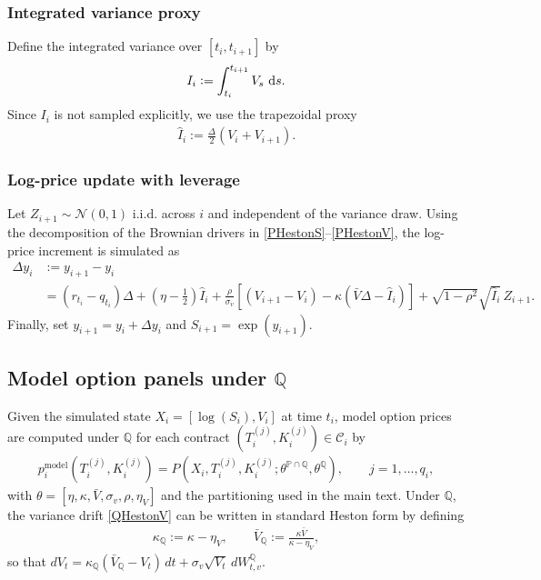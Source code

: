 \documentclass[11pt,a4paper,notitlepage]{article}
\numberwithin{equation}{section}
\begin{document}
\subsubsection{Integrated variance proxy}
Define the integrated variance over $[t_i,t_{i+1}]$ by
\begin{align}
I_i := \int_{t_i}^{t_{i+1}} V_s\,\dif s.
\end{align}
Since $I_i$ is not sampled explicitly, we use the trapezoidal proxy
\begin{align}
\widehat{I}_i := \frac{\Delta}{2}\left(V_i+V_{i+1}\right).
\label{eq:I_trap}
\end{align}

\subsubsection{Log-price update with leverage}
Let $Z_{i+1}\sim\mathcal{N}(0,1)$ i.i.d. across $i$ and independent of the variance draw.
Using the decomposition of the Brownian drivers in \eqref{PHestonS}--\eqref{PHestonV},
the log-price increment is simulated as
\begin{align}
\Delta y_i
&:= y_{i+1}-y_i \nonumber\\
&= (r_{t_i}-q_{t_i})\Delta
+ \left(\eta-\frac{1}{2}\right)\widehat{I}_i
+ \frac{\rho}{\sigma_v}\left[\left(V_{i+1}-V_i\right)-\kappa\left(\bar{V}\Delta-\widehat{I}_i\right)\right]
+ \sqrt{1-\rho^2}\sqrt{\widehat{I}_i}\,Z_{i+1}.
\label{eq:logS_update}
\end{align}
Finally, set $y_{i+1}=y_i+\Delta y_i$ and $S_{i+1}=\exp(y_{i+1})$.

\subsection{Model option panels under $\mathbb{Q}$}
Given the simulated state $X_i=[\log(S_i),V_i]$ at time $t_i$, model option prices are computed under
$\mathbb{Q}$ for each contract $(T_i^{(j)},K_i^{(j)})\in\mathcal{C}_i$ by
\begin{align}
p_{i}^{\mathrm{model}}(T_i^{(j)},K_i^{(j)})
= P\!\left(X_i,T_i^{(j)},K_i^{(j)};\theta^{\mathbb{P}\cap\mathbb{Q}},\theta^{\mathbb{Q}}\right),
\qquad j=1,\dots,q_i,
\label{eq:panel_model_prices}
\end{align}
with $\theta=[\eta,\kappa,\bar V,\sigma_v,\rho,\eta_V]$ and the partitioning used in the main text.
Under $\mathbb{Q}$, the variance drift \eqref{QHestonV} can be written in standard Heston form by defining
\begin{align}
\kappa_{\mathbb{Q}} := \kappa-\eta_V,
\qquad
\bar V_{\mathbb{Q}} := \frac{\kappa\bar V}{\kappa-\eta_V},
\end{align}
so that $dV_t=\kappa_{\mathbb{Q}}(\bar V_{\mathbb{Q}}-V_t)\,dt+\sigma_v\sqrt{V_t}\,dW^{\mathbb{Q}}_{t,v}$.
\end{document}
